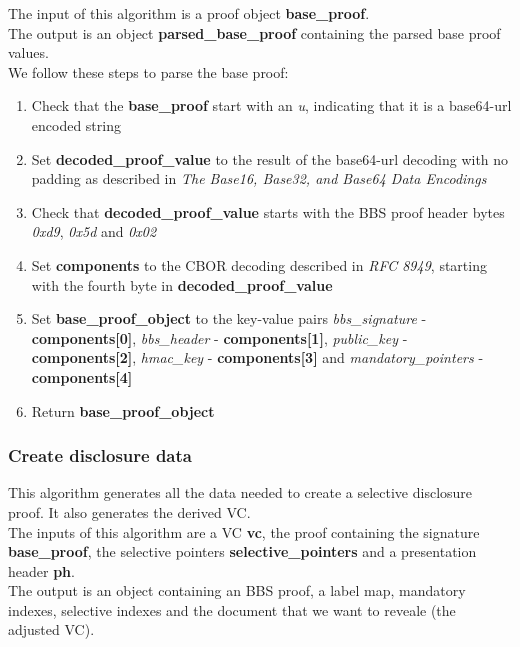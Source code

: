 \documentclass[
	a4paper               %
	,BCOR=0mm            %
	,bibliography=totoc   %
	,listof=totoc         %
	,monolingual
	,twoside=false
]{bfhthesis}              %
\begin{document}
The input of this algorithm is a proof object \textbf{base\_proof}.\\

The output is an object \textbf{parsed\_base\_proof} containing the parsed base proof values.\\

We follow these steps to parse the base proof:
\begin{enumerate}
	\item Check that the \textbf{base\_proof} start with an \textit{u}, indicating that it is a base64-url encoded string
	\item Set \textbf{decoded\_proof\_value} to the result of the base64-url decoding with no padding as described in \textit{The Base16, Base32, and Base64 Data Encodings}\cite{base64}
	\item Check that \textbf{decoded\_proof\_value} starts with the BBS proof header bytes \textit{0xd9}, \textit{0x5d} and \textit{0x02}
	\item Set \textbf{components} to the CBOR decoding described in \textit{RFC 8949}\cite{cbor}, starting with the fourth byte in \textbf{decoded\_proof\_value}
	\item Set \textbf{base\_proof\_object} to the key-value pairs \textit{bbs\_signature} - \textbf{components[0]}, \textit{bbs\_header} - \textbf{components[1]}, \textit{public\_key} - \textbf{components[2]}, \textit{hmac\_key} - \textbf{components[3]} and \textit{mandatory\_pointers} - \textbf{components[4]}
	\item Return \textbf{base\_proof\_object}
\end{enumerate}

\subsubsection{Create disclosure data}
\label{subsub:createdisclosuredata}
This algorithm generates all the data needed to create a selective disclosure proof. It also generates the derived VC.\\

The inputs of this algorithm are a VC \textbf{vc}, the proof containing the signature \textbf{base\_proof}, the selective pointers \textbf{selective\_pointers} and a presentation header \textbf{ph}.\\

The output is an object containing an BBS proof, a label map, mandatory indexes, selective indexes and the document that we want to reveale (the adjusted VC).\\
\end{document}
